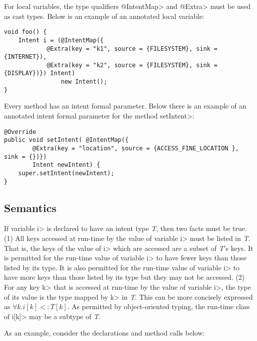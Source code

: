 For local variables, the type qualifiers \<@IntentMap> and \<@Extra> must be used
as cast types. Below is an example of an annotated local variable:

\begin{Verbatim}
void foo() {
    Intent i = (@IntentMap({
            @Extra(key = "k1", source = {FILESYSTEM}, sink = {INTERNET}),
            @Extra(key = "k2", source = {FILESYSTEM}, sink = {DISPLAY})}) Intent)
                new Intent();
}
\end{Verbatim}

Every \onReceive{} method has an intent formal parameter.
Below there is an example of an annotated intent formal
parameter for the \onReceive{} method \<setIntent>:

\begin{Verbatim}
@Override
public void setIntent( @IntentMap({
        @Extra(key = "location", source = {ACCESS_FINE_LOCATION }, sink = {})})
        Intent newIntent) {
    super.setIntent(newIntent);
}
\end{Verbatim}

\subsection{Semantics}
If variable \<i> is declared to have an intent type \textit{T}, then two facts must be
true. (1) All keys accessed at run-time by the value of variable \<i> must be
listed in \textit{T}. That is, the keys of the value of \<i> which are accessed
are a subset of \textit{T}'s keys. It is
permitted for the run-time value of variable \<i> to have fewer keys than those
listed by its type. It is also permitted for the run-time value of variable
\<i> to have more keys than those listed by its type but they may not be
accessed. (2) For any key \<k> that is accessed at run-time by the value of
variable \<i>, the type of its value is the type mapped by \<k> in \textit{T}. This can be more
concisely expressed as $\forall k.i[k] <: T[k]$. As permitted by object-oriented
typing, the run-time class of \<i[k]> may be a subtype of \textit{T}.

As an example, consider the declarations and method calls below:

